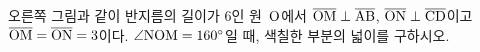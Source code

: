 \noindent\begin{minipage}[t]{0.58\linewidth}\vspace{0pt}\raggedright 오른쪽 그림과 같이 반지름의 길이가 $6$인 원~$\mathrm{O}$에서 $\overline{\mathrm{OM}}\perp\overline{\mathrm{AB}}$, $\overline{\mathrm{ON}}\perp\overline{\mathrm{CD}}$이고 $\overline{\mathrm{OM}}=\overline{\mathrm{ON}}=3$이다. $\angle\mathrm{NOM}=160^\circ$일 때, 색칠한 부분의 넓이를 구하시오.\end{minipage}\hfill\begin{minipage}[t]{0.4\linewidth}\vspace{0pt}\centering \resizebox{\ifdim\width>\linewidth\linewidth\else\width\fi}{!}{}\end{minipage}\par

